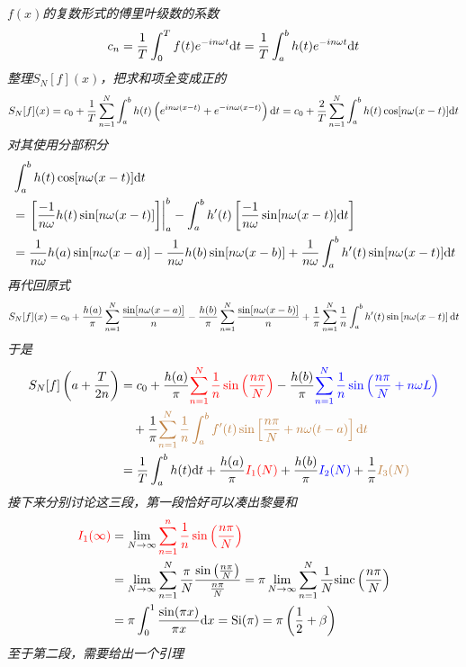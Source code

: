 \documentclass[main.tex]{subfiles}
\begin{document}
\vspace{1cm}

\textit{
    \(f(x)\)的复数形式的傅里叶级数的系数
    \[c_n = \frac{1}{T} \int_{0}^{T} f(t)e^{-in\omega t}{\rm d}t = \frac{1}{T} \int_{a}^{b}h(t)e^{-in\omega t}{\rm d}t\]
    整理\(S_N[f](x)\)，把求和项全变成正的
    \[S_N[f](x) = c_0+\frac{1}{T}\sum_{n=1}^{N}\int_{a}^{b}h(t)\left(e^{in\omega(x-t)}+e^{-in\omega(x-t)}\right){\rm d}t = c_0+\frac{2}{T}\sum_{n=1}^{N}\int_{a}^{b} h(t)\cos[n\omega(x-t)]{\rm d}t\]
    对其使用分部积分
    \begin{align*}
        & \int_{a}^{b}h(t)\cos[n\omega(x-t)]{\rm d}t \\
        &= \left.\left[\frac{-1}{n\omega}h(t)\sin[n\omega(x-t)]\right]\right|_{a}^{b}-\int_{a}^{b} h'(t)\left[\frac{-1}{n\omega}\sin[n\omega(x-t)]{\rm d}t\right] \\
        &= \frac{1}{n\omega}h(a)\sin[n\omega(x-a)] - \frac{1}{n\omega}h(b)\sin[n\omega(x-b)] + \frac{1}{n\omega}\int_{a}^{b}h'(t)\sin[n\omega(x-t)]{\rm d}t
    \end{align*}
    再代回原式
    \[S_N[f](x) = c_0+\frac{h(a)}{\pi}\sum_{n=1}^{N}\frac{\sin[n\omega(x-a)]}{n} - \frac{h(b)}{\pi}\sum_{n=1}^{N}\frac{\sin[n\omega(x-b)]}{n} + \frac{1}{\pi}\sum_{n=1}^{N}\frac{1}{n}\int_{a}^{b}h'(t)\sin\left[n\omega(x-t)\right]{\rm d}t\]
    于是
    \begin{align*}
        S_N[f]\left(a+\frac{T}{2n}\right) &= c_0 +\frac{h(a)}{\pi}{\color{red}\sum_{n=1}^{N}\frac{1}{n}\sin\left(\frac{n\pi}{N}\right)} 
        -\frac{h(b)}{\pi}{\color{blue}\sum_{n=1}^{N}\frac{1}{n}\sin\left(\frac{n\pi}{N}+n\omega L\right)} \\
        & \quad +\frac{1}{\pi}{\color{brown}\sum_{n=1}^{N}\frac{1}{n}\int_{a}^  {b}f'(t)\sin\left[\frac{n\pi}{N}+n\omega(t-a)\right]{\rm d}t} \\
        &= \frac{1}{T}\int_{a}^{b}h(t){\rm d}t + \frac{h(a)}{\pi}{\color{red}I_1(N)}+ \frac{h(b)}{\pi}{\color{blue}I_2(N)} + \frac{1}{\pi}{\color{brown}I_3(N)}
    \end{align*}
    接下来分别讨论这三段，第一段恰好可以凑出黎曼和
    \begin{align*}
        {\color{red}I_1(\infty)} & = \lim_{N \to \infty}{\color{red}\sum_{n=1}^{n}\frac{1}{n}\sin\left(\frac{n\pi}{N}\right)} \\
        &=  \lim_{N \to \infty} \sum_{n=1}^{N}\frac{\pi}{N}\frac{\sin\left(\frac{n\pi}{N}\right)}{\frac{n\pi}{N}}  = \pi \lim_{N\to\infty} \sum_{n=1}^{N}\frac{1}{N}{\rm sinc}\left(\frac{n\pi}{N}\right)\\
        &= \pi\int_{0}^{1}\frac{\sin(\pi x)}{\pi x}{\rm d}x = {\rm Si}(\pi) = \pi\left(\frac{1}{2}+\beta\right)
    \end{align*}
    至于第二段，需要给出一个引理
}
\end{document}
